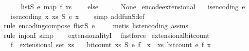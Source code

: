\begin{isabellebody}
\ \ \ \ \ \ list\isactrlsub S\ e\ {\isacharparenleft}{\kern0pt}map\ f\ xs{\isacharparenright}{\kern0pt}\isanewline
\ \ \ \ else\isanewline
\ \ \ \ \ \ None{\isacharparenright}{\kern0pt}{\isachardoublequoteclose}\isanewline
\isanewline
{}\isamarkupfalse%
\ encode{\isacharunderscore}{\kern0pt}extensional{\isacharcolon}{\kern0pt}\isanewline
\ \ \ {\isachardoublequoteopen}is{\isacharunderscore}{\kern0pt}encoding\ e{\isachardoublequoteclose}\isanewline
\ \ \ {\isachardoublequoteopen}is{\isacharunderscore}{\kern0pt}encoding\ {\isacharparenleft}{\kern0pt}{\isasymlambda}x{\isachardot}{\kern0pt}\ {\isacharparenleft}{\kern0pt}xs\ {\isasymrightarrow}\isactrlsub S\ e{\isacharparenright}{\kern0pt}\ x{\isacharparenright}{\kern0pt}{\isachardoublequoteclose}\isanewline
%
\isadelimproof
\ \ %
\endisadelimproof
%
\isatagproof
{}\isamarkupfalse%
\ {\isacharparenleft}{\kern0pt}simp\ add{\isacharcolon}{\kern0pt}fun\isactrlsub S{\isacharunderscore}{\kern0pt}def{\isacharparenright}{\kern0pt}\isanewline
\ \ \isamarkupfalse%
\ {\isacharparenleft}{\kern0pt}rule\ encoding{\isacharunderscore}{\kern0pt}compose{\isacharbrackleft}{\kern0pt}\ f{\isacharequal}{\kern0pt}{\isachardoublequoteopen}list\isactrlsub S\ e{\isachardoublequoteclose}{\isacharbrackright}{\kern0pt}{\isacharparenright}{\kern0pt}\isanewline
\ \ \ \isamarkupfalse%
\ {\isacharparenleft}{\kern0pt}metis\ list{\isacharunderscore}{\kern0pt}encoding\ assms{\isacharparenright}{\kern0pt}\isanewline
\ \ \isamarkupfalse%
\ {\isacharparenleft}{\kern0pt}rule\ inj{\isacharunderscore}{\kern0pt}onI{\isacharcomma}{\kern0pt}\ simp{\isacharparenright}{\kern0pt}\isanewline
\ \ \isamarkupfalse%
\ extensionalityI\ \isamarkupfalse%
\ fastforce%
\endisatagproof
{\isafoldproof}%
%
\isadelimproof
\isanewline
%
\endisadelimproof
\isanewline
{}\isamarkupfalse%
\ extensional{\isacharunderscore}{\kern0pt}bit{\isacharunderscore}{\kern0pt}count{\isacharcolon}{\kern0pt}\isanewline
\ \ \ {\isachardoublequoteopen}f\ {\isasymin}\ extensional\ {\isacharparenleft}{\kern0pt}set\ xs{\isacharparenright}{\kern0pt}{\isachardoublequoteclose}\isanewline
\ \ \ {\isachardoublequoteopen}bit{\isacharunderscore}{\kern0pt}count\ {\isacharparenleft}{\kern0pt}{\isacharparenleft}{\kern0pt}xs\ {\isasymrightarrow}\isactrlsub S\ e{\isacharparenright}{\kern0pt}\ f{\isacharparenright}{\kern0pt}\ {\isacharequal}{\kern0pt}\ {\isacharparenleft}{\kern0pt}{\isasymSum}x\ {\isasymleftarrow}\ xs{\isachardot}{\kern0pt}\ bit{\isacharunderscore}{\kern0pt}count\ {\isacharparenleft}{\kern0pt}e\ {\isacharparenleft}{\kern0pt}f\ x{\isacharparenright}{\kern0pt}{\isacharparenright}{\kern0pt}\ {\isacharplus}{\kern0pt}\ {}{\isacharparenright}{\kern0pt}\ {\isacharplus}{\kern0pt}\ {}{\isachardoublequoteclose}\isanewline

\end{isabellebody}
